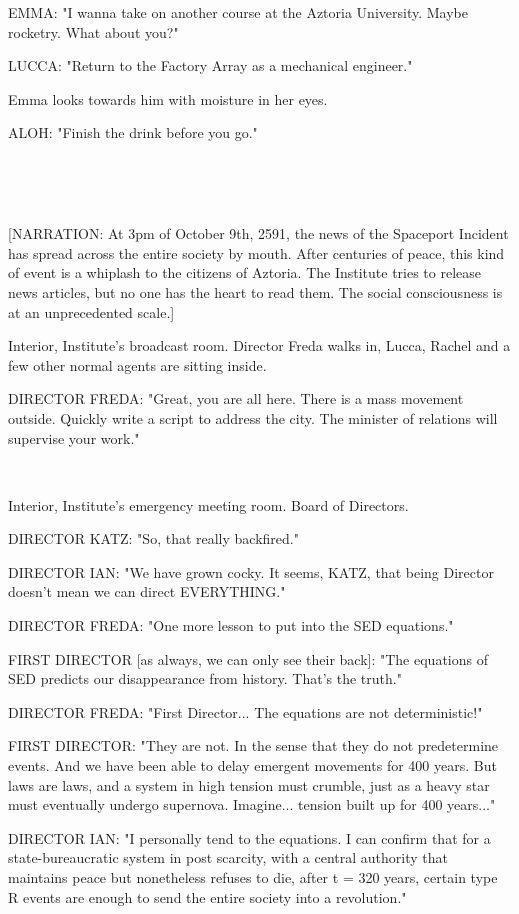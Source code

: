 \documentclass[11pt]{article}
\begin{document}
EMMA: "I wanna take on another course at the Aztoria University.
Maybe rocketry. 
What about you?"

LUCCA: "Return to the Factory Array as a mechanical engineer."

Emma looks towards him with moisture in her eyes.

ALOH: "Finish the drink before you go."

\ 

\ 

[NARRATION: At 3pm of October 9th, 2591, the news of the Spaceport Incident has spread across the entire society by mouth.
After centuries of peace, this kind of event is a whiplash to the citizens of Aztoria.
The Institute tries to release news articles, but no one has the heart to read them.
The social consciousness is at an unprecedented scale.]

Interior, Institute's broadcast room.
Director Freda walks in, Lucca, Rachel and a few other normal agents are sitting inside.

DIRECTOR FREDA: "Great, you are all here.
There is a mass movement outside.
Quickly write a script to address the city. 
The minister of relations will supervise your work."

\ 

Interior, Institute's emergency meeting room. 
Board of Directors. 

DIRECTOR KATZ: "So, that really backfired."

DIRECTOR IAN: "We have grown cocky.
It seems, KATZ, that being Director doesn't mean we can direct EVERYTHING."

DIRECTOR FREDA: "One more lesson to put into the SED equations."

FIRST DIRECTOR [as always, we can only see their back]: "The equations of SED predicts our disappearance from history.
That's the truth."

DIRECTOR FREDA: "First Director... The equations are not deterministic!"

FIRST DIRECTOR: "They are not. In the sense that they do not predetermine events.
And we have been able to delay emergent movements for 400 years.
But laws are laws, and a system in high tension must crumble, just as a heavy star must eventually undergo supernova.
Imagine... tension built up for 400 years..."

DIRECTOR IAN: "I personally tend to the equations. 
I can confirm that for a state-bureaucratic system in post scarcity, with a central authority that maintains peace but nonetheless refuses to die, after t = 320 years, certain type R events are enough to send the entire society into a revolution."
\end{document}
